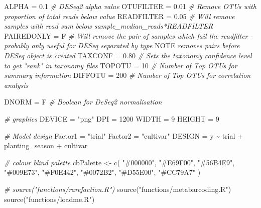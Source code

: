 \documentclass[
]{article}
\newenvironment{Shaded}{\begin{snugshade}}{\end{snugshade}}
\newcommand{\AlertTok}[1]{\textcolor[rgb]{0.94,0.16,0.16}{#1}}
\newcommand{\CommentTok}[1]{\textcolor[rgb]{0.56,0.35,0.01}{\textit{#1}}}
\newcommand{\DecValTok}[1]{\textcolor[rgb]{0.00,0.00,0.81}{#1}}
\newcommand{\FloatTok}[1]{\textcolor[rgb]{0.00,0.00,0.81}{#1}}
\newcommand{\FunctionTok}[1]{\textcolor[rgb]{0.00,0.00,0.00}{#1}}
\newcommand{\NormalTok}[1]{#1}
\newcommand{\OtherTok}[1]{\textcolor[rgb]{0.56,0.35,0.01}{#1}}
\newcommand{\SpecialCharTok}[1]{\textcolor[rgb]{0.00,0.00,0.00}{#1}}
\newcommand{\StringTok}[1]{\textcolor[rgb]{0.31,0.60,0.02}{#1}}
\begin{document}
\begin{Shaded}
\begin{Highlighting}[]
\NormalTok{ALPHA }\OtherTok{=}      \FloatTok{0.1}   \CommentTok{\# DESeq2 alpha value}
\NormalTok{OTUFILTER }\OtherTok{=}  \FloatTok{0.01}  \CommentTok{\# Remove OTUs with proportion of total reads below value}
\NormalTok{READFILTER }\OtherTok{=} \FloatTok{0.05}  \CommentTok{\# Will remove samples with read sum below sample\_median\_reads*READFILTER }
\NormalTok{PAIREDONLY }\OtherTok{=}\NormalTok{ F     }\CommentTok{\# Will remove the pair of samples which fail the readfilter {-} probably only useful for DESeq separated by type }\AlertTok{NOTE}\CommentTok{ removes pairs before DESeq object is created   }
\NormalTok{TAXCONF }\OtherTok{=}    \FloatTok{0.80}  \CommentTok{\# Sets the taxonomy confidence level to get "rank" in taxonomy files}
\NormalTok{TOPOTU }\OtherTok{=}     \DecValTok{10}    \CommentTok{\# Number of Top OTUs for summary information}
\NormalTok{DIFFOTU }\OtherTok{=}    \DecValTok{200}    \CommentTok{\# Number of Top OTUs for correlation analysis}

\NormalTok{DNORM }\OtherTok{=}\NormalTok{      F     }\CommentTok{\# Boolean for DeSeq2 normalisation}

\CommentTok{\# graphics}
\NormalTok{DEVICE }\OtherTok{=}     \StringTok{"png"}
\NormalTok{DPI }\OtherTok{=}        \DecValTok{1200}
\NormalTok{WIDTH }\OtherTok{=}      \DecValTok{9}
\NormalTok{HEIGHT }\OtherTok{=}     \DecValTok{9}

\CommentTok{\# Model design}
\NormalTok{Factor1 }\OtherTok{=} \StringTok{"trial"}
\NormalTok{Factor2 }\OtherTok{=} \StringTok{"cultivar"}
\NormalTok{DESIGN }\OtherTok{=}\NormalTok{ y }\SpecialCharTok{\textasciitilde{}}\NormalTok{ trial }\SpecialCharTok{+}\NormalTok{ planting\_season }\SpecialCharTok{+}\NormalTok{ cultivar}
\end{Highlighting}
\end{Shaded}

\begin{Shaded}
\begin{Highlighting}[]
\CommentTok{\# colour blind palette}
\NormalTok{cbPalette }\OtherTok{\textless{}{-}} \FunctionTok{c}\NormalTok{(}
  \StringTok{"\#000000"}\NormalTok{, }\StringTok{"\#E69F00"}\NormalTok{, }\StringTok{"\#56B4E9"}\NormalTok{, }\StringTok{"\#009E73"}\NormalTok{, }
  \StringTok{"\#F0E442"}\NormalTok{, }\StringTok{"\#0072B2"}\NormalTok{, }\StringTok{"\#D55E00"}\NormalTok{, }\StringTok{"\#CC79A7"}
\NormalTok{)}

\CommentTok{\# source("functions/rarefaction.R")}
\FunctionTok{source}\NormalTok{(}\StringTok{"functions/metabarcoding.R"}\NormalTok{)}
\FunctionTok{source}\NormalTok{(}\StringTok{"functions/loadme.R"}\NormalTok{)}
\end{Highlighting}
\end{Shaded}
\end{document}
